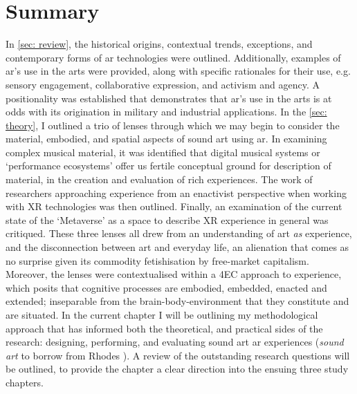 \section{Summary}\label{sec: method-summary}
In \autoref{sec: review}, the historical origins, contextual trends, exceptions, and contemporary forms of \gls{ar} technologies were outlined. Additionally, examples of \gls{ar}'s use in the arts were provided, along with specific rationales for their use, e.g. sensory engagement, collaborative expression, and activism and agency. A positionality was established that demonstrates that \gls{ar}'s use in the arts is at odds with its origination in military and industrial applications. In the \autoref{sec: theory}, I outlined a trio of lenses through which we may begin to consider the material, embodied, and spatial aspects of sound art using \gls{ar}. In examining complex musical material, it was identified that digital musical systems or `performance ecosystems' offer us fertile conceptual ground for description of material, in the creation and evaluation of rich experiences. The work of researchers approaching experience from an enactivist perspective when working with XR technologies was then outlined. Finally, an examination of the current state of the `Metaverse' as a space to describe XR experience in general was critiqued. These three lenses all drew from an understanding of art \textit{as} experience, and the disconnection between art and everyday life, an alienation that comes as no surprise given its commodity fetishisation by free-market capitalism. Moreover, the lenses were contextualised within a 4EC approach to experience, which posits that cognitive processes are embodied, embedded, enacted and extended; inseparable from the brain-body-environment that they constitute and are situated. In the current chapter I will be outlining my methodological approach that has informed both the theoretical, and practical sides of the research: designing, performing, and evaluating sound art \gls{ar} experiences (\textit{sound \gls{art}} to borrow from Rhodes \citeyearpar{rhodes2018}). A review of the outstanding research questions will be outlined, to provide the chapter a clear direction into the ensuing three study chapters.

\begin{enumerate}
    \RQmedium
    \RQexperience
\end{enumerate}

